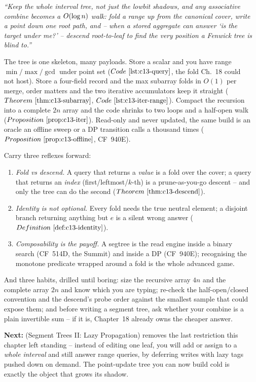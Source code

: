 \begin{lastword}
\emph{``Keep the whole interval tree, not just the lowbit shadows, and any
associative combine becomes a \(O(\log n)\) walk: fold a range up from the
canonical cover, write a point down one root path, and -- when a stored aggregate can
answer `is the target under me?' -- descend root-to-leaf to find the very position a
Fenwick tree is blind to.''}

\medskip
The tree is one skeleton, many payloads. Store a scalar and you have range
\(\min/\max/\gcd\) under point set (\(\coderef{c13-query}\), the fold Ch.~18 could not
host). Store a four-field record and the max subarray folds in \(O(1)\) per merge, order
matters and the two iterative accumulators keep it straight (\(\thmref{c13-subarray}\),
\(\coderef{c13-iter-range}\)). Compact the recursion into a complete \(2n\) array and
the code shrinks to two loops and a half-open walk (\(\propref{c13-iter}\)). Read-only
and never updated, the same build is an oracle an offline sweep or a DP transition
calls a thousand times (\(\propref{c13-offline}\), CF~940E).

\medskip
Carry three reflexes forward:
\begin{enumerate}[nosep, leftmargin=1.6em]
  \item \emph{Fold vs descend.} A query that returns a \emph{value} is a fold over the
        cover; a query that returns an \emph{index} (first/leftmost/\(k\)-th) is a
        prune-as-you-go descent -- and only the tree can do the second
        (\(\thmref{c13-descend}\)).
  \item \emph{Identity is not optional.} Every fold needs the true neutral element;
        a disjoint branch returning anything but \(e\) is a silent wrong answer
        (\(\defref{c13-identity}\)).
  \item \emph{Composability is the payoff.} A segtree is the read engine inside a
        binary search (CF~514D, the Summit) and inside a DP (CF~940E); recognising the
        monotone predicate wrapped around a fold is the whole advanced game.
\end{enumerate}

\medskip
And three habits, drilled until boring: size the recursive array \(4n\) and the
complete array \(2n\) and know which you are typing; re-check the half-open/closed
convention and the descend's probe order against the smallest sample that could expose
them; and before writing a segment tree, ask whether your combine is a plain invertible
sum -- if it is, Chapter~18 already owns the cheaper answer.

\medskip
\textbf{Next:}  (Segment Trees II: Lazy Propagation) removes the last
restriction this chapter left standing -- instead of editing one leaf, you will add or
assign to a \emph{whole interval} and still answer range queries, by deferring writes
with lazy tags pushed down on demand. The point-update tree you can now build cold is
exactly the object that grows its shadow.
\end{lastword}

